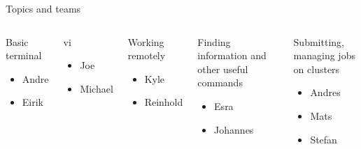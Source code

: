 \begin{frame}{Topics and teams}
\footnotesize

\begin{columns}
   \begin{block}{Basic terminal}
    \begin{itemize}
      \item Andre
      \item Eirik
    \end{itemize}
   \end{block}

   \begin{block}{vi}
    \begin{itemize}
      \item Joe
      \item Michael
    \end{itemize}
   \end{block}

   \begin{block}{Working remotely}
    \begin{itemize}
      \item Kyle
      \item Reinhold
    \end{itemize}
   \end{block}

   \begin{block}{Finding information and other useful commands}
    \begin{itemize}
      \item Esra
      \item Johannes
    \end{itemize}
   \end{block}

   \begin{block}{Submitting, managing jobs on clusters}
    \begin{itemize}
      \item Andres
      \item Mats
      \item Stefan
    \end{itemize}
   \end{block}
\end{columns}

%
%
%
%
%
%
%
%
%
%
%
%
%

\end{frame}
